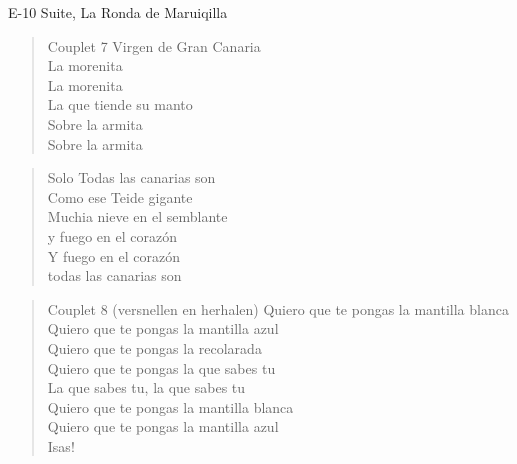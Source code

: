 \begin{song}[vals]{E-10 Suite, La Ronda de Maruiqilla}
\begin{verse}{Couplet 7}
Virgen de Gran Cana\chord{}ria\\
\chord{}La morenita\\
La morenita\\
La que tiende su man\chord{}to\\
\chord{}Sobre la armita\\
Sobre la armita\\
\end{verse}

\begin{verse}{Solo}
Todas las canarias son\\
Como ese Teide gigante\\
Muchia nieve en el semblante\\
y fuego en el corazón\\
Y fuego en el corazón\\
todas las canarias son\\
\end{verse}

\begin{verse}{Couplet 8 (versnellen en herhalen)}
\chord{}Quiero que te pongas la mantilla blanca\\
Quiero que te pongas la mantilla azul\\
\chord{}Quiero que te pongas la recolarada\\
Quiero que te pongas la que sabes tu\\
La que sabes tu, la que sabes tu\\
\chord{}Quiero que te pongas la mantilla blanca\\
Quiero que te pongas la mantilla azul\\
\chord{}Isas!\hspace{1em}\hspace{1em}
\end{verse}
\end{song}
